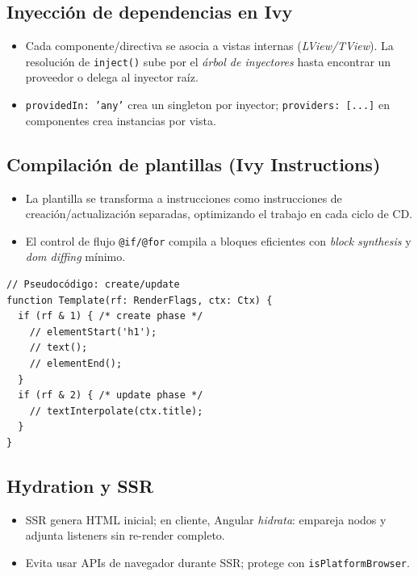 \documentclass[11pt,a4paper]{article}
\begin{document}
\subsection{Inyección de dependencias en Ivy}
\begin{itemize}[leftmargin=*]
  \item Cada componente/directiva se asocia a vistas internas (\emph{LView/TView}). La resolución de \texttt{inject()} sube por el \emph{árbol de inyectores} hasta encontrar un proveedor o delega al inyector raíz.
  \item \texttt{providedIn: 'any'} crea un singleton por inyector; \texttt{providers: [...]} en componentes crea instancias por vista.
\end{itemize}

\subsection{Compilación de plantillas (Ivy Instructions)}
\begin{itemize}[leftmargin=*]
  \item La plantilla se transforma a instrucciones como instrucciones de creación/actualización separadas, optimizando el trabajo en cada ciclo de CD.
  \item El control de flujo \texttt{@if/@for} compila a bloques eficientes con \emph{block synthesis} y \emph{dom diffing} mínimo.
\end{itemize}

\begin{lstlisting}[style=tsstyle, caption={Esquema simplificado de plantilla compilada}]
// Pseudocódigo: create/update
function Template(rf: RenderFlags, ctx: Ctx) {
  if (rf & 1) { /* create phase */
    // elementStart('h1');
    // text();
    // elementEnd();
  }
  if (rf & 2) { /* update phase */
    // textInterpolate(ctx.title);
  }
}
\end{lstlisting}

\subsection{Hydration y SSR}
\begin{itemize}[leftmargin=*]
  \item SSR genera HTML inicial; en cliente, Angular \emph{hidrata}: empareja nodos y adjunta listeners sin re-render completo.
  \item Evita usar APIs de navegador durante SSR; protege con \texttt{isPlatformBrowser}.
\end{itemize}
\end{document}
